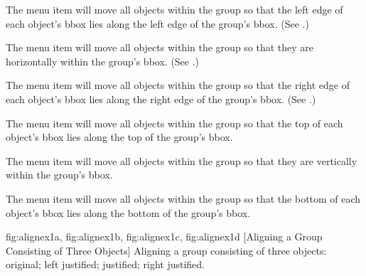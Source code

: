 
The  menu item will move all objects
within the \gls{group} so that the left edge of each object's \gls{bbox}
lies along the left edge of the group's \gls*{bbox}.  (See
.)


The  menu item will move all objects
within the \gls{group} so that they are  horizontally
within the group's \gls*{bbox}.  (See .)


The  menu item will move all objects
within the \gls{group} so that the right edge of each object's \gls*{bbox}
lies along the right edge of the group's \gls*{bbox}.  (See
.)


The  menu item will move all objects
within the \gls{group} so that the top of each object's \gls*{bbox} lies along the
top of the group's \gls*{bbox}.


The  menu item will move all objects
within the \gls{group} so that they are  vertically
within the group's \gls{bbox}.


The  menu item will move all objects
within the \gls{group} so that the bottom of each object's \gls*{bbox} lies
along the bottom of the group's \gls*{bbox}.

{
  {fig:alignex1a}{}{},
  {fig:alignex1b}{}{},
  {fig:alignex1c}{}{},
  {fig:alignex1d}{}{}
}
[Aligning a Group Consisting of Three Objects]
{Aligning a group consisting of three objects: 
 original; 
 left justified; 
  justified; 
 right justified.}


